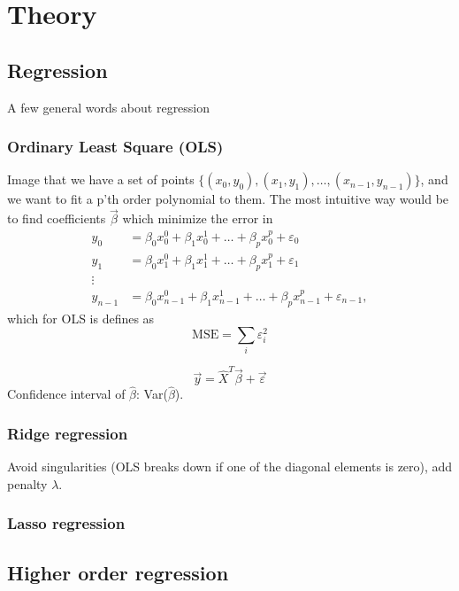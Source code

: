 \section{Theory} \label{sec:theory}

\subsection{Regression} \label{sec:regression}
A few general words about regression

\subsubsection{Ordinary Least Square (OLS)} \label{sec:OLS}
Image that we have a set of points $\{(x_0, y_0), (x_1, y_1),\hdots, (x_{n-1}, y_{n-1})\}$, and we want to fit a p'th order polynomial to them. The most intuitive way would be to find coefficients $\vec{\beta}$ which minimize the error in
\begin{align*}
y_0&=\beta_0x_0^0+\beta_1x_0^1+\hdots+\beta_px_0^p+\varepsilon_0\\
y_1&=\beta_0x_1^0+\beta_1x_1^1+\hdots+\beta_px_1^p+\varepsilon_1\\
\vdots\\
y_{n-1}&=\beta_0x_{n-1}^0+\beta_1x_{n-1}^1+\hdots+\beta_px_{n-1}^p+\varepsilon_{n-1},
\end{align*}
which for OLS is defines as
\begin{equation}
\text{MSE}=\sum_i\varepsilon_i^2
\end{equation}

\begin{equation}
\vec{y}=\hat{X}^T\vec{\beta}+\vec{\varepsilon}
\end{equation}
Confidence interval of $\hat{\beta}$: Var($\hat{\beta}$).

\subsubsection{Ridge regression} \label{sec:ridge}
Avoid singularities (OLS breaks down if one of the diagonal elements is zero), add penalty $\lambda$.

\subsubsection{Lasso regression} \label{sec:lasso}


\subsection{Higher order regression} \label{sec:higher_reg}

